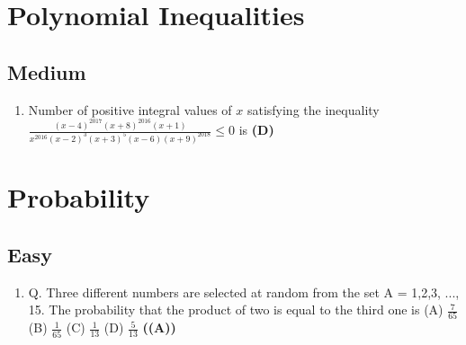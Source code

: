 \documentclass{article}
\begin{document}
\section{Polynomial Inequalities}
\subsection{Medium}
\begin{enumerate}
\item Number of positive integral values of $x$ satisfying the inequality $\frac{(x - 4)^{2017} (x + 8)^{2016} (x + 1)}{x^{2016} (x - 2)^3 (x + 3)^5 (x - 6) (x + 9)^{2018}} \leq 0$ is \hfill \textbf{(D)}
\end{enumerate}
\section{Probability}
\subsection{Easy}
\begin{enumerate}
\item Q. Three different numbers are selected at random from the set A = {1,2,3, ..., 15}. The probability that the product of two is equal to the third one is
(A) $\frac{7}{65}$
(B) $\frac{1}{65}$
(C) $\frac{1}{13}$
(D) $\frac{5}{13}$ \hfill \textbf{((A))}
\end{enumerate}
\end{document}
